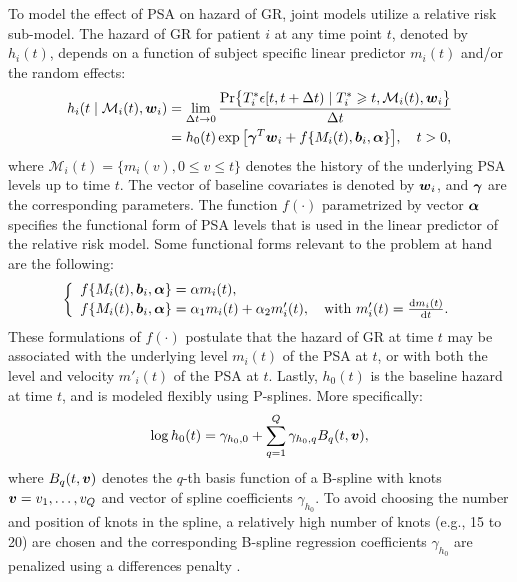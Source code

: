 To model the effect of PSA on hazard of GR, joint models utilize a relative risk sub-model. The hazard of GR for patient $i$ at any time point $t$, denoted by $h_i(t)$, depends on a function of subject specific linear predictor $m_i(t)$ and/or the random effects:
\begin{align*}
h_i(t \mid \mathcal{M}_i(t), \boldsymbol{w}_i) &= \lim_{\Delta t \to 0} \frac{\mbox{Pr}\big\{T^*_i \epsilon [t, t + \Delta t) \mid T^*_i \geqslant t, \mathcal{M}_i(t), \boldsymbol{w}_i\big\}}{\Delta t}\\
&=h_0(t) \exp\big[\boldsymbol{\gamma}^T\boldsymbol{w}_i + f\{M_i(t), \boldsymbol{b}_i, \boldsymbol{\alpha}\}\big], \quad t>0,
\end{align*}
where $\mathcal{M}_i(t) = \{m_i(v), 0\leq v \leq t\}$ denotes the history of the underlying PSA levels up to time $t$. The vector of baseline covariates is denoted by $\boldsymbol{w}_i$, and $\boldsymbol{\gamma}$ are the corresponding parameters. The function $f(\cdot)$ parametrized by vector $\boldsymbol{\alpha}$ specifies the functional form of PSA levels \citep{brown2009assessing,rizopoulos2012joint,taylor2013real,rizopoulos2014bma} that is used in the linear predictor of the relative risk model. Some functional forms relevant to the problem at hand are the following: 
\begin{eqnarray*}
\left \{
\begin{array}{l}
f\{M_i(t), \boldsymbol{b}_i, \boldsymbol{\alpha}\} = \alpha m_i(t),\\
f\{M_i(t), \boldsymbol{b}_i, \boldsymbol{\alpha}\} = \alpha_1 m_i(t) + \alpha_2 m'_i(t),\quad \text{with}\  m'_i(t) = \frac{\mathrm{d}{m_i(t)}}{\mathrm{d}{t}}.\\
\end{array}
\right.
\end{eqnarray*}
These formulations of $f(\cdot)$ postulate that the hazard of GR at time $t$ may be associated with the underlying level $m_i(t)$ of the PSA at $t$, or with both the level and velocity $m'_i(t)$ of the PSA at $t$. Lastly, $h_0(t)$ is the baseline hazard at time $t$, and is modeled flexibly using P-splines. More specifically:
\begin{equation*}
\log{h_0(t)} = \gamma_{h_0,0} + \sum_{q=1}^Q \gamma_{h_0,q} B_q(t, \boldsymbol{v}),
\end{equation*}
where $B_q(t, \boldsymbol{v})$ denotes the $q$-th basis function of a B-spline with knots $\boldsymbol{v} = v_1, \ldots, v_Q$ and vector of spline coefficients $\gamma_{h_0}$. To avoid choosing the number and position of knots in the spline, a relatively high number of knots (e.g., 15 to 20) are chosen and the corresponding B-spline regression coefficients $\gamma_{h_0}$ are penalized using a differences penalty \citep{eilers1996flexible}.

